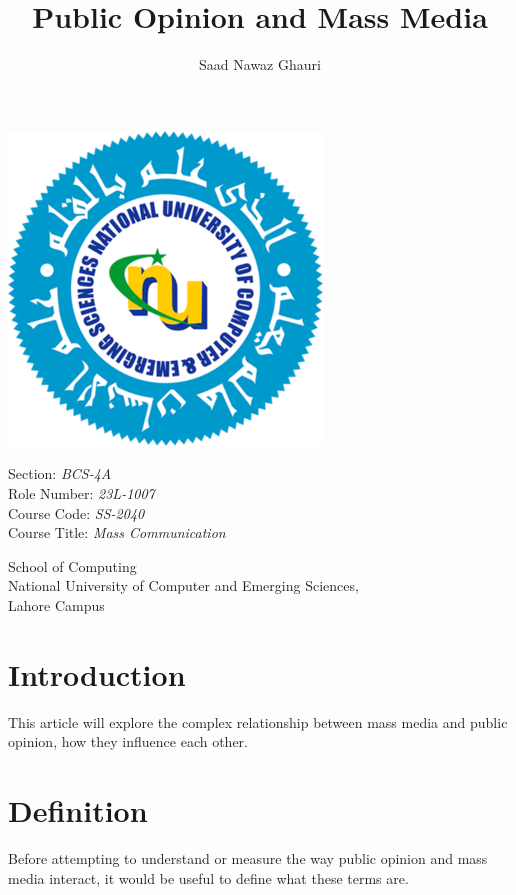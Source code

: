 \documentclass[a4paper,12pt]{article}
\author{Saad Nawaz Ghauri}
\title{Public Opinion and Mass Media}
\begin{document}
\maketitle

\begin{Center}
\includegraphics{nuces_logo.png}
\end{Center}

\begin{Center}
    Section: \emph{BCS-4A} \\
    Role Number: \emph{23L-1007} \\
    Course Code: \emph{SS-2040} \\
    Course Title: \emph{Mass Communication} \\
\end{Center}

\begin{Center}
    School of Computing \\
    National University of Computer and Emerging Sciences, \\
    Lahore Campus \\
\end{Center}

\newpage

\tableofcontents
\newpage


\section{Introduction}
This article will explore the complex relationship between mass media and public opinion, how they influence each other.

\section{Definition}
Before attempting to understand or measure the way public opinion and mass media interact, it would be useful to define what these terms are.
\end{document}
